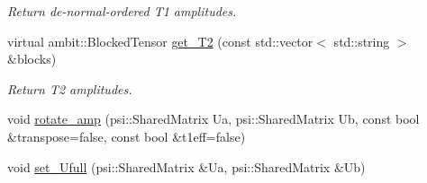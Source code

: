 \begin{DoxyCompactItemize}
\begin{DoxyCompactList}\small\item\em Return de-\/normal-\/ordered T1 amplitudes. \end{DoxyCompactList}\item 
virtual ambit\+::\+Blocked\+Tensor \mbox{\hyperlink{classforte_1_1_t_h_r_e_e___d_s_r_g___m_r_p_t2_ab6313c66e40f8b599c323bf3077a827f}{get\+\_\+\+T2}} (const std\+::vector$<$ std\+::string $>$ \&blocks)
\begin{DoxyCompactList}\small\item\em Return T2 amplitudes. \end{DoxyCompactList}\item 
void \mbox{\hyperlink{classforte_1_1_t_h_r_e_e___d_s_r_g___m_r_p_t2_a895eea98080f2ba764d7bc3bb148ffcb}{rotate\+\_\+amp}} (psi\+::\+Shared\+Matrix Ua, psi\+::\+Shared\+Matrix Ub, const bool \&transpose=false, const bool \&t1eff=false)
\item 
void \mbox{\hyperlink{classforte_1_1_t_h_r_e_e___d_s_r_g___m_r_p_t2_a715a85f86bbbc3af62644acde4e3c4d2}{set\+\_\+\+Ufull}} (psi\+::\+Shared\+Matrix \&Ua, psi\+::\+Shared\+Matrix \&Ub)
\end{DoxyCompactItemize}

